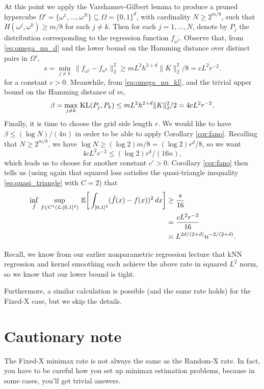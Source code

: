 \documentclass{article}
\begin{document}
At this point we apply the Varshamov-Gilbert lemma to produce a pruned hypercube
$\Omega' = \{\omega^1,\dots,\omega^N \} \subseteq \Omega = \{0,1\}^d$, with
cardinality $N \geq 2^{m/8}$, such that $H(\omega^j,\omega^k) \geq m/8$ for each
$j \not= k$. Then for each $j=1,\dots,N$, denote by $P_j$ the distribution
corresponding to the regression function $f_{\omega^j}$. Observe that, from 
\eqref{eq:omega_nu_d} and the lower bound on the Hamming distance over distinct
pairs in $\Omega'$,
\[
s = \min_{j \not= k} \, \| f_{\omega^j} - f_{\omega^k} \|_2^2 
\geq m L^2 h^{2+d} \|K\|_2^2 / 8 = c L^2 r^{-2}. 
\]
for a constant $c>0$. Meanwhile, from \eqref{eq:omega_nu_kl}, and the trivial
upper bound on the Hamming distance of $m$,
\[
\beta = \max_{j \not= k} \, \mathrm{KL}(P_j,P_k) \leq m L^2 h^{2+d} \|K\|_2^2 / 2 
= 4c L^2 r^{-2}.
\]
Finally, it is time to choose the grid side length $r$. We would like to have
$\beta \leq (\log N)/(4n)$ in order to be able to apply Corollary
\ref{cor:fano}. Recalling that $N \geq 2^{m/8}$, we have $\log N \geq (\log 2) m
/ 8 = (\log 2) r^d / 8$, so we want
\[
4c L^2 r^{-2} \leq (\log 2) r^d / (16n),
\]
which leads us to choose  for
another constant $c'>0$. Corollary \ref{cor:fano} then tells us (using again
that squared loss satisfies the quasi-triangle inequality
\eqref{eq:quasi_triangle} with $C=2$) that 
\begin{align*}
\inf_{\hat{f}} \, \sup_{f \in C^1(L; [0,1]^d)} \, \mathbb{E} \bigg[ \int_{[0,1]^d} (\hat{f}(x) -
  f(x))^2 \, dx \bigg] 
&\geq \frac{s}{16} \\
&= \frac{cL^2 r^{-2}}{16} \\
&\asymp L^{2d/(2+d)} n^{-2/(2+d)}.
\end{align*}  

Recall, we know from our earlier nonparametric regression lecture that kNN
regression and kernel smoothing each achieve the above rate in squared $L^2$ 
norm, so we know that our lower bound is tight.  

Furthermore, a similar calculation is possible (and the same rate holds) for the
Fixed-X case, but we skip the details. 

\section{Cautionary note}

The Fixed-X minimax rate is not always the same as the Random-X rate. In fact,
you have to be careful how you set up minimax estimation problems, because in
some cases, you'll get trivial answers. 
\end{document}
